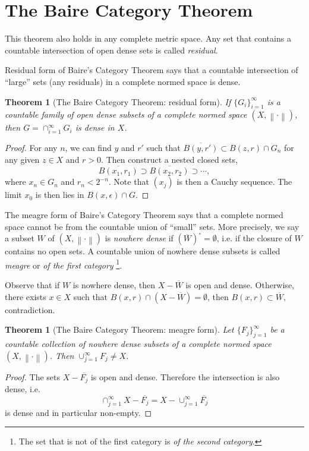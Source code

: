 \documentclass[12pt,a4paper]{report}
\numberwithin{equation}{section}
\theoremstyle{mystyle}
\newtheorem{theorem}[definition]{Theorem}
\newcommand{\norm}[1]{\left\lVert #1 \right\rVert}
\begin{document}
	
	\section{The Baire Category Theorem}
	
	This theorem also holds in any complete metric space. Any set that contains a countable intersection of open dense sets is called \emph{residual}.
	
	Residual form of Baire's Category Theorem says that a countable intersection of ``large'' sets (any residuals) in a complete normed space is dense.
	\begin{theorem}[The Baire Category Theorem: residual form]
		If $\{G_i\}_{i=1}^\infty$ is a countable family of open dense subsets of a complete normed space $(X,\norm{\cdot})$, then $G=\cap_{i=1}^\infty G_i$ is dense in $X$.
	\end{theorem}
	\begin{proof}
		For any $n$, we can find $y$ and $r'$ such that $\overline{B(y,r')}\subset B(z,r)\cap G_n$ for any given $z\in X$ and $r>0$. Then construct a nested closed sets,
		$$
		\overline{B(x_1,r_1)}\supset \overline{B(x_2,r_2)}\supset \cdots,
		$$
		where $x_n\in G_n$ and $r_n<2^{-n}$. Note that $(x_j)$ is then a Cauchy sequence. The limit $x_0$ is then lies in $B(x,\epsilon)\cap G$.
	\end{proof}
	
	The meagre form of Baire's Category Theorem says that a complete normed space cannot be from the countable union of ``small'' sets. More precisely, we say a subset $W$ of $(X,\norm{\cdot})$ is \emph{nowhere dense} if $(\overline{W})^\circ = \emptyset$, i.e. if the closure of $W$ contains no open sets. A countable union of nowhere dense subsets is called \emph{meagre} or \emph{of the first category}
	\footnote{The set that is not of the first category is \emph{of the second category}.}.
	
	Observe that if $W$ is nowhere dense, then $X-\overline{W}$ is open and dense. Otherwise, there exists $x\in X$ such that $B(x,r)\cap (X-\overline{W})=\emptyset$, then $B(x,r)\subset \overline{W}$, contradiction.
	
	\begin{theorem}[The Baire Category Theorem: meagre form]
		Let $\{F_j\}_{j=1}^\infty$ be a countable collection of nowhere dense subsets of a complete normed space $(X,\norm{\cdot})$. Then $\cup_{j=1}^\infty F_j\neq X$.
	\end{theorem}
	\begin{proof}
		The sets $X-\overline{F_j}$ is open and dense. Therefore the intersection is also dense, i.e. 
		$$
		\cap_{j=1}^\infty X-\overline{F_j} = X-\cup_{j=1}^\infty \overline{F_j}
		$$
		is dense and in particular non-empty.
	\end{proof}
	
\end{document}

